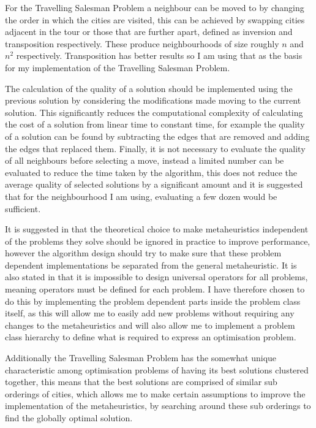\documentclass[]{final_report}
\begin{document}
For the Travelling Salesman Problem a neighbour can be moved to by changing the order in which the cities are visited, this can be achieved by swapping cities adjacent in the tour or those that are further apart, defined as inversion and transposition respectively. These produce neighbourhoods of size roughly $n$ and $n^{2}$ respectively\cite{siarry:2016}. Transposition has better results\cite{siarry:2016} so I am using that as the basis for my implementation of the Travelling Salesman Problem.

The calculation of the quality of a solution should be implemented using the previous solution by considering the modifications made moving to the current solution. This significantly reduces the computational complexity of calculating the cost of a solution from linear time to constant time\cite{siarry:2016}, for example the quality of a solution can be found by subtracting the edges that are removed and adding the edges that replaced them. Finally, it is not necessary to evaluate the quality of all neighbours before selecting a move, instead a limited number can be evaluated to reduce the time taken by the algorithm, this does not reduce the average quality of selected solutions by a significant amount and it is suggested that for the neighbourhood I am using, evaluating a few dozen would be sufficient\cite{siarry:2016}.

It is suggested in \cite{martin:2010} that the theoretical choice to make metaheuristics independent of the problems they solve should be ignored in practice to improve performance, however the algorithm design should try to make sure that these problem dependent implementations be separated from the general metaheuristic. It is also stated in \cite{siarry:2016} that it is impossible to design universal operators for all problems, meaning operators must be defined for each problem. I have therefore chosen to do this by implementing the problem dependent parts inside the problem class itself, as this will allow me to easily add new problems without requiring any changes to the metaheuristics and will also allow me to implement a problem class hierarchy to define what is required to express an optimisation problem.

Additionally the Travelling Salesman Problem has the somewhat unique characteristic among optimisation problems of having its best solutions clustered together, this means that the best solutions are comprised of similar sub orderings of cities, which allows me to make certain assumptions to improve the implementation of the metaheuristics, by searching around these sub orderings to find the globally optimal solution.
\end{document}

